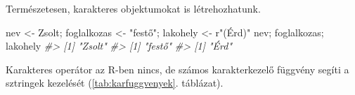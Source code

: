 \documentclass[
]{book}
\newenvironment{Shaded}{\begin{snugshade}}{\end{snugshade}}
\newcommand{\CommentTok}[1]{\textcolor[rgb]{0.56,0.35,0.01}{\textit{#1}}}
\newcommand{\NormalTok}[1]{#1}
\newcommand{\OtherTok}[1]{\textcolor[rgb]{0.56,0.35,0.01}{#1}}
\newcommand{\StringTok}[1]{\textcolor[rgb]{0.31,0.60,0.02}{#1}}
\begin{document}
\begin{table}

\caption{\label{tab:escapes}Néhány escape szekvencia}
\centering
{}
\end{table}

Természetesen, karakteres objektumokat is létrehozhatunk.

\begin{Shaded}
\begin{Highlighting}[]
\NormalTok{nev }\OtherTok{\textless{}{-}} \StringTok{\textquotesingle{}Zsolt\textquotesingle{}}\NormalTok{; foglalkozas }\OtherTok{\textless{}{-}} \StringTok{"festő"}\NormalTok{; lakohely }\OtherTok{\textless{}{-}}\NormalTok{ r}\StringTok{"(Érd)"}
\NormalTok{nev; foglalkozas; lakohely}
\CommentTok{\#\textgreater{} [1] "Zsolt"}
\CommentTok{\#\textgreater{} [1] "festő"}
\CommentTok{\#\textgreater{} [1] "Érd"}
\end{Highlighting}
\end{Shaded}

Karakteres operátor az R-ben nincs, de számos karakterkezelő függvény segíti a sztringek kezelését (\ref{tab:karfuggvenyek}. táblázat).
\end{document}
